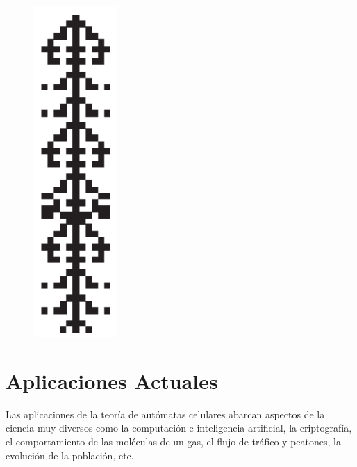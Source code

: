 \begin{figure}[H]
\centering
\includegraphics[scale=0.7]{imagenes/ejemplo_3.png}
\end{figure}




\section{Aplicaciones Actuales} %
Las aplicaciones de la teoría de autómatas celulares abarcan aspectos de la ciencia muy diversos como la computación e inteligencia artificial, la criptografía, el comportamiento de las moléculas de un gas, el flujo de tráfico y peatones, la evolución de la población, etc.

